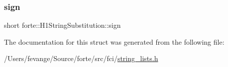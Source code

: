 \subsubsection{\texorpdfstring{sign}{sign}}
{\footnotesize\ttfamily short forte\+::\+H1\+String\+Substitution\+::sign}



The documentation for this struct was generated from the following file\+:\begin{DoxyCompactItemize}
\item 
/\+Users/fevange/\+Source/forte/src/fci/\mbox{\hyperlink{string__lists_8h}{string\+\_\+lists.\+h}}\end{DoxyCompactItemize}
